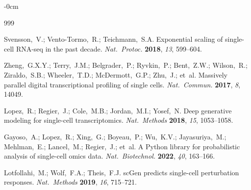 \documentclass[11pt,a4paper]{article}
\newlength{\extralength}
\begin{document}
\begin{adjustwidth}{-\extralength}{0cm}





\begin{thebibliography}{999}
\setlength{\itemsep}{0pt}\setlength{\parskip}{0pt}\setlength{\parsep}{0pt}

Svensson,~V.; Vento-Tormo,~R.; Teichmann,~S.A. Exponential scaling of single-cell RNA-seq in the past decade. {\em Nat.\ Protoc.} {\bf 2018}, {\em 13}, 599--604.

Zheng,~G.X.Y.; Terry,~J.M.; Belgrader,~P.; Ryvkin,~P.; Bent,~Z.W.; Wilson,~R.; Ziraldo,~S.B.; Wheeler,~T.D.; McDermott,~G.P.; Zhu,~J.; et~al. Massively parallel digital transcriptional profiling of single cells. {\em Nat.\ Commun.} {\bf 2017}, {\em 8}, 14049.

Lopez,~R.; Regier,~J.; Cole,~M.B.; Jordan,~M.I.; Yosef,~N. Deep generative modeling for single-cell transcriptomics. {\em Nat.\ Methods} {\bf 2018}, {\em 15}, 1053--1058.

Gayoso,~A.; Lopez,~R.; Xing,~G.; Boyeau,~P.; Wu,~K.V.; Jayasuriya,~M.; Mehlman,~E.; Lancel,~M.; Regier,~J.; et~al. A Python library for probabilistic analysis of single-cell omics data. {\em Nat.\ Biotechnol.} {\bf 2022}, {\em 40}, 163--166.

Lotfollahi,~M.; Wolf,~F.A.; Theis,~F.J. scGen predicts single-cell perturbation responses. {\em Nat.\ Methods} {\bf 2019}, {\em 16}, 715--721.


\end{thebibliography}
\end{adjustwidth}
\end{document}
